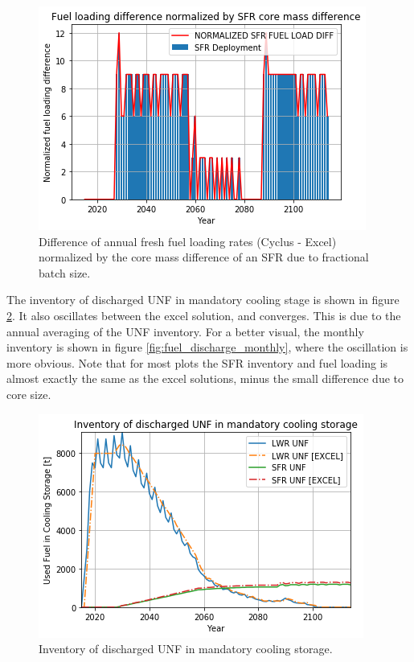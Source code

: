 \begin{figure}[htbp!]
    \begin{center}
        \includegraphics[scale=0.6]{./images/results_18/fuel_load_diff_norm.png}
    \end{center}
        \caption{Difference of annual fresh fuel loading rates (Cyclus - Excel) normalized by the core mass difference of an \gls{SFR} due to fractional batch size.}
    \label{fig:fuel_load_diff_norm}
\end{figure}


The inventory of discharged \gls{UNF} in mandatory cooling stage is shown
in figure \ref{fig:fuel_discharge}. It also oscillates between the excel solution,
and converges. This is due to the annual averaging of
the \gls{UNF} inventory. For a better visual, the monthly inventory is shown
in figure \ref{fig:fuel_discharge_monthly}, where the oscillation is more obvious.
Note that for most plots the \gls{SFR} inventory and fuel loading is almost
exactly the same as the excel solutions, minus the small difference due to core
size.

\begin{figure}[htbp!]
    \begin{center}
        \includegraphics[scale=0.6]{./images/results_18/fuel_discharge.png}
    \end{center}
        \caption{Inventory of discharged \gls{UNF} in mandatory cooling storage.}
    \label{fig:fuel_discharge}
\end{figure}


